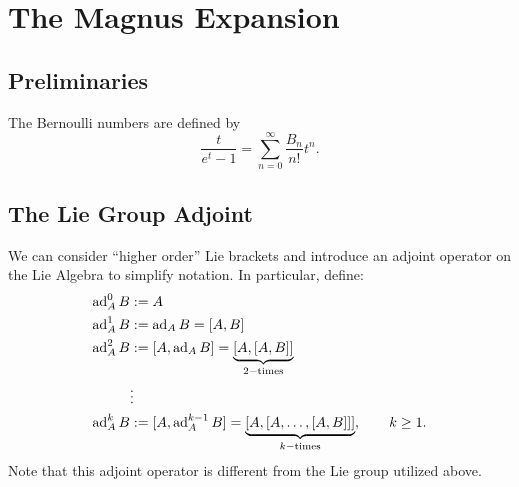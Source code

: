 
\chapter{The Magnus Expansion}



\section{Preliminaries}

The Bernoulli numbers are defined by
\begin{equation}
  \label{eq:bernoulli_number_definition}
  \frac{t}{e^t - 1} = \sum_{n=0}^\infty \frac{B_n}{n!} t^n.
\end{equation}

\section{The Lie Group Adjoint}

We can consider ``higher order'' Lie brackets and introduce an adjoint operator on the Lie Algebra to simplify notation.  In particular, define:
\begin{equation}
  \begin{aligned}
    \operatorname{ad}_A^0 B & : = A                                                                                                              \\
    \operatorname{ad}_A^1 B & : = \operatorname{ad}_A B = [A,B]                                                                                          \\
    \operatorname{ad}_A^2 B & : =[A,  \operatorname{ad}_A B] = \underbrace{[A,[A,B]]}_{2-\mathrm{times}}                                             \\
                  & \vdots                                                                                                               \\
    \operatorname{ad}_A^k B & := [A, \operatorname{ad}_A^{k - 1} B] = \underbrace{[A, [ A , \ldots, [A,B]]]}_{k-\mathrm{times}} , \qquad k \geq 1.
  \end{aligned}
\end{equation}
Note that this adjoint operator is different from the Lie group utilized above.

